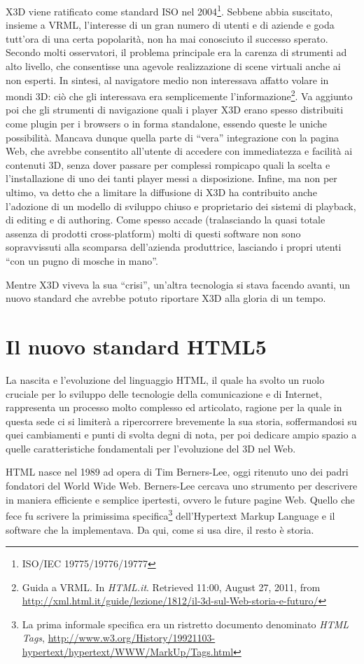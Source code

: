 X3D viene ratificato come standard ISO nel 2004\footnote{ISO/IEC 19775/19776/19777}. Sebbene abbia suscitato, insieme a VRML, l'interesse di un gran numero di utenti e di aziende e goda tutt'ora di una certa popolarità, non ha mai conosciuto il successo sperato. Secondo molti osservatori, il problema principale era la carenza di strumenti ad alto livello, che consentisse una agevole realizzazione di scene virtuali anche ai non esperti. In sintesi, al navigatore medio non interessava affatto volare in mondi 3D: ciò che gli interessava era semplicemente l'informazione\footnote{Guida a VRML. In \textit{HTML.it}. Retrieved 11:00, August 27, 2011, from \url{http://xml.html.it/guide/lezione/1812/il-3d-sul-Web-storia-e-futuro/}}. Va aggiunto poi che gli strumenti di navigazione quali i player X3D erano spesso distribuiti come plugin per i browsers o in forma stand\-alone, essendo queste le uniche possibilità. Mancava dunque quella parte di “vera” integrazione con la pagina Web, che avrebbe consentito all'utente di accedere con immediatezza e facilità ai contenuti 3D, senza dover passare per complessi rompicapo quali la scelta e l'installazione di uno dei tanti player messi a disposizione. Infine, ma non per ultimo, va detto che a limitare la diffusione di X3D ha contribuito anche l'adozione di un modello di sviluppo chiuso e proprietario dei sistemi di playback, di editing e di authoring. Come spesso accade (tralasciando la quasi totale assenza di prodotti cross-platform) molti di questi software non sono sopravvissuti alla scomparsa dell'azienda produttrice, lasciando i propri utenti “con un pugno di mosche in mano”.

Mentre X3D viveva la sua “crisi”, un'altra tecnologia si stava facendo avanti, un nuovo standard che avrebbe potuto riportare X3D alla gloria di un tempo.

\section{Il nuovo standard HTML5}
La nascita e l'evoluzione del linguaggio HTML, il quale ha svolto un ruolo cruciale per lo sviluppo delle tecnologie della comunicazione e di Internet, rappresenta un processo molto complesso ed articolato, ragione per la quale  in questa sede ci si limiterà  a ripercorrere brevemente la sua storia, soffermandosi su quei cambiamenti e punti di svolta degni di nota, per poi dedicare ampio spazio a quelle caratteristiche fondamentali per l'evoluzione del 3D nel Web.

HTML nasce nel 1989 ad opera di Tim Berners-Lee, oggi ritenuto uno dei padri fondatori del World Wide Web. Berners-Lee cercava uno strumento per descrivere in maniera efficiente e semplice ipertesti, ovvero le future pagine Web. Quello che fece fu scrivere la primissima specifica\footnote{La prima informale specifica era un ristretto documento denominato \textit{HTML Tags}, \url{http://www.w3.org/History/19921103-hypertext/hypertext/WWW/MarkUp/Tags.html}} dell'Hypertext Markup Language e il software che la implementava. Da qui, come si usa dire, il resto è storia.

